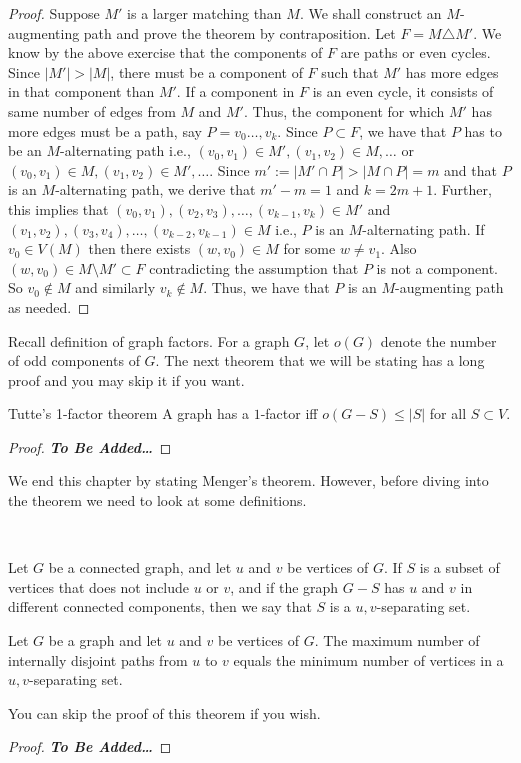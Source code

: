 \documentclass[../basic_graph_theory.tex]{subfiles}
\begin{document}
\begin{proof}
    Suppose $M'$ is a larger matching than $M$. We shall construct an $M$-augmenting path and prove the theorem by contraposition. Let $F = M \triangle M'$. We know by the above exercise that the components of $F$ are paths or even cycles. Since $|M'| > |M|$, there must be a component of $F$ such that $M'$ has more edges in that component than $M'$. If a component in $F$ is an even cycle, it consists of same number of edges from $M$ and $M'$. Thus, the component for which $M'$ has more edges must be a path, say $P = v_0\ldots,v_k$. Since $P \subset F$, we have that $P$ has to be an $M$-alternating path i.e., $(v_0,v_1) \in M', (v_1,v_2) \in M, \ldots$ or $(v_0,v_1) \in M, (v_1,v_2) \in M', \ldots$. Since $m' := |M' \cap P| > |M \cap P| = m$ and that $P$ is an $M$-alternating path,  we derive that $m' - m = 1$ and $k = 2m + 1$.  Further, this implies that $(v_0,v_1),(v_2,v_3),\ldots,(v_{k-1},v_k) \in M'$ and $(v_1,v_2), (v_3,v_4),\ldots,(v_{k-2},v_{k-1}) \in M$ i.e.,  $P$ is an $M$-alternating path.   If $v_0 \in V(M)$ then there exists $(w,v_0) \in M$ for some $w \neq v_1$.  Also $(w,v_0) \in M \setminus M' \subset F$ contradicting the assumption that $P$ is not a component.   So $v_0 \notin M$ and similarly $v_k \notin M$.   Thus,  we have that $P$ is an $M$-augmenting path as needed.
\end{proof}
Recall definition of graph factors.  For a graph $G$, let $o(G)$ denote the number of odd components of $G$. The next theorem that we will be stating has a long proof and you may skip it if you want.
%
\begin{Thm}{Tutte's 1-factor theorem}{}
    A graph has a $1$-factor iff $o(G-S) \leq |S|$ for all $S \subset V$.
\end{Thm}
\begin{proof}
    \textbf{\textit{To Be Added\dots}}
\end{proof}
We end this chapter by stating Menger's theorem. However, before diving into the theorem we need to look at some definitions.

\

Let $G$ be a connected graph, and let $u$ and $v$ be vertices of $G$. If $S$ is a subset of vertices that does not include $u$ or $v$, and if the graph $G-S$ has $u$ and $v$ in different connected components, then we say that $S$ is a $u,v$-separating set.\\
\begin{Thm}{}{}
    Let $G$ be a graph and let $u$ and $v$ be vertices of $G$. The maximum number of internally disjoint paths from $u$ to $v$ equals the minimum number of vertices in a $u,v$-separating set.
\end{Thm}
You can skip the proof of this theorem if you wish.
\begin{proof}
    \textbf{\textit{To Be Added\dots}}
\end{proof}
\end{document}

